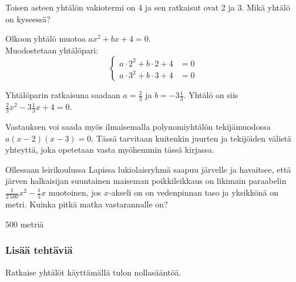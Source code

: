 \begin{tehtavasivu}
\begin{tehtava}
    Toisen asteen yhtälön vakiotermi on 4 ja sen ratkaisut ovat 2 ja 3. Mikä yhtälö on kyseessä?

    \begin{vastaus}
		Olkoon yhtälö muotoa $ax^2+bx+4=0$. \\      
      Muodostetaan yhtälöpari:
      \[
        \left\{
          \begin{aligned}
            a\cdot 2^2 + b\cdot 2 + 4 &= 0 \\
            a\cdot 3^2 + b\cdot 3 + 4 &= 0
          \end{aligned}
        \right.
      \]
      
      Yhtälöparin ratkaisuna saadaan $a=\frac23$ ja $b=-3\frac13$. Yhtälö on siis $\frac{2}{3}x^2-3\frac{1}{3}x+4=0$.
      
      Vastauksen voi saada myös ilmaisemalla polynomiyhtälön tekijämuodossa $a(x-2)(x-3)=0$. Tässä tarvitaan kuitenkin juurten ja tekijöiden välistä yhteyttä, joka opetetaan vasta myöhemmin tässä kirjassa.
    \end{vastaus}
\end{tehtava}

\begin{tehtava}
Ollessaan leirikoulussa Lapissa lukiolaisryhmä saapuu järvelle ja havaitsee, että järven halkaisijan suuntainen maiseman poikkileikkaus on likimain paraabelin $\frac{1}{2\,500}x^2-\frac{1}{5}x$ muotoinen, jos $x$-akseli on on vedenpinnan taso ja yksikkönä on metri. Kuinka pitkä matka vastarannalle on?
\begin{vastaus}
$500$ metriä
\end{vastaus}
\end{tehtava}

\subsubsection*{Lisää tehtäviä}

\begin{tehtava}
    Ratkaise yhtälöt käyttämällä tulon nollasääntöä.
    \begin{vastaus}
    \end{vastaus}
\end{tehtava}


\end{tehtavasivu}
